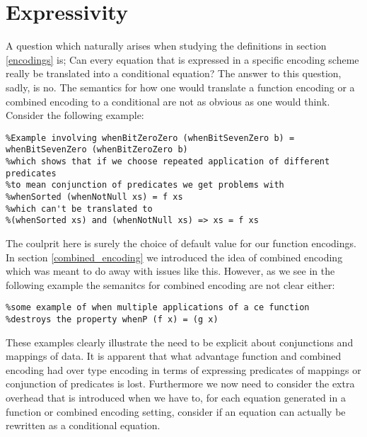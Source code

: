 \section{Expressivity}

A question which naturally arises when studying the
definitions in section \ref{encodings} is;
Can every equation that is expressed in a specific encoding
scheme really be translated into a conditional equation?
The answer to this question, sadly, is no. The semantics
for how one would translate a function encoding or a combined
encoding to a conditional are not as obvious as one would think.
Consider the following example:
\begin{verbatim}
%Example involving whenBitZeroZero (whenBitSevenZero b) = whenBitSevenZero (whenBitZeroZero b)
%which shows that if we choose repeated application of different predicates
%to mean conjunction of predicates we get problems with
%whenSorted (whenNotNull xs) = f xs
%which can't be translated to
%(whenSorted xs) and (whenNotNull xs) => xs = f xs
\end{verbatim}

The coulprit here is surely the choice of default value for our function encodings. 
In section \ref{combined_encoding} we introduced the idea of combined encoding which was meant to do away
with issues like this. However, as we see in the following example
the semanitcs for combined encoding are not clear either:
\begin{verbatim}
%some example of when multiple applications of a ce function
%destroys the property whenP (f x) = (g x)
\end{verbatim}

These examples clearly illustrate the need to be explicit about conjunctions
and mappings of data. It is apparent that what advantage function
and combined encoding had over type encoding in terms of expressing
predicates of mappings or conjunction of predicates is lost.
Furthermore we now need to consider the extra overhead that is introduced
when we have to, for each equation generated in a function or combined
encoding setting, consider if an equation can actually be rewritten
as a conditional equation.
